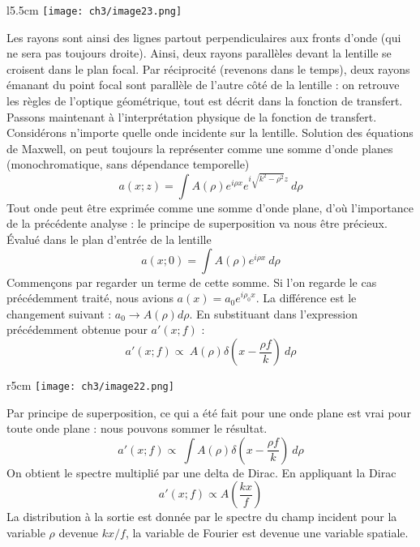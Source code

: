 	\begin{wrapfigure}[9]{l}{5.5cm}
	\vspace{-5mm}
	\texttt{[image: ch3/image23.png]}
	\end{wrapfigure}
Les rayons sont ainsi des lignes partout perpendiculaires aux fronts d'onde (qui ne sera pas toujours 
droite). Ainsi, deux rayons parallèles devant la lentille se croisent dans le plan focal. Par réciprocité 
(revenons dans le temps), deux rayons émanant du point focal sont parallèle de l'autre côté de la 
lentille : on retrouve les règles de l'optique géométrique, tout est décrit dans la fonction de transfert.\\

Passons maintenant à l'interprétation physique de la fonction de transfert. Considérons n'importe quelle 
onde incidente sur la lentille. Solution des équations de Maxwell, on peut toujours la représenter comme
une somme d'onde planes (monochromatique, sans dépendance temporelle)
\begin{equation}
a(x;z) = \int A(\rho)e^{i\rho x}e^{i\sqrt{k^2-\rho^2}z}\ d\rho
\end{equation}
Tout onde peut être exprimée comme une somme d'onde plane, d'où l'importance de la précédente analyse : 
le principe de superposition va nous être précieux. Évalué dans le plan d'entrée de la lentille 
\begin{equation}
a(x;0) = \int A(\rho)e^{i\rho x}\ d\rho
\end{equation}
Commençons par regarder un terme de cette somme. Si l'on regarde le cas précédemment traité, nous 
avions $a(x) = a_0 e^{i\rho_0x}$. La différence est le changement suivant : $a_0\rightarrow A(\rho)d\rho$.
En substituant dans l'expression précédemment obtenue pour $a'(x;f)$ :
\begin{equation}
a'(x;f) \propto\ A(\rho)\delta\left(x-\frac{\rho f}{k}\right)\ d\rho
\end{equation}

	\begin{wrapfigure}[10]{r}{5cm}
	\vspace{-5mm}
	\texttt{[image: ch3/image22.png]}
	\end{wrapfigure}
Par principe de superposition, ce qui a été fait pour une onde plane est vrai pour toute onde plane : 
nous pouvons sommer le résultat.
\begin{equation}
a'(x;f) \propto\ \int A(\rho)\delta\left(x-\frac{\rho f}{k}\right)\ d\rho
\end{equation}
On obtient le spectre multiplié par une delta de Dirac. En appliquant la Dirac
\begin{equation}
a'(x;f) \propto A\left(\dfrac{kx}{f}\right)
\end{equation}
La distribution à la sortie est donnée par le spectre du champ incident pour la variable $\rho$ devenue 
$kx/f$, la variable de Fourier est devenue une variable spatiale.\\

